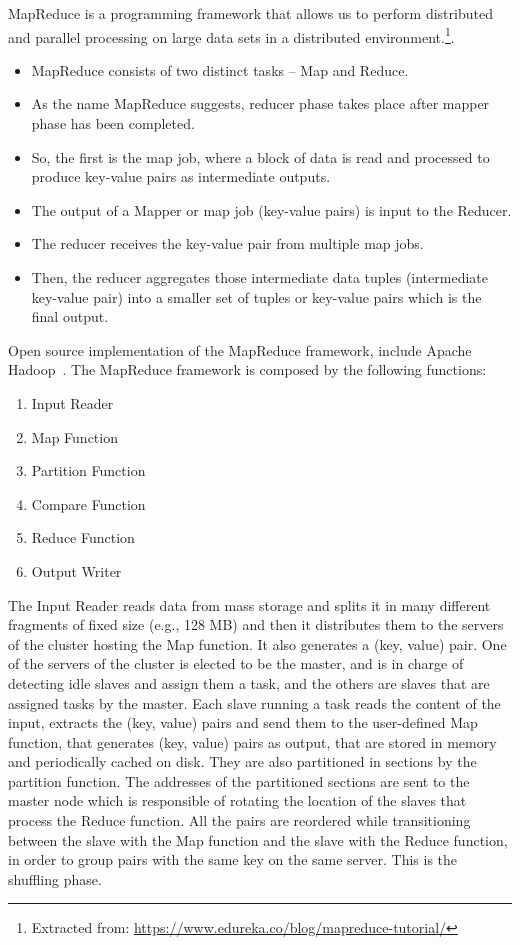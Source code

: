 MapReduce is a programming framework that allows us to perform distributed and parallel processing on large data sets in a distributed environment.\footnote{Extracted from: \url{https://www.edureka.co/blog/mapreduce-tutorial/}}.
\begin{itemize}
	\item MapReduce consists of two distinct tasks – Map and Reduce.
	\item As the name MapReduce suggests, reducer phase takes place after mapper phase has been completed.
	\item So, the first is the map job, where a block of data is read and processed to produce key-value pairs as intermediate outputs.
	\item The output of a Mapper or map job (key-value pairs) is input to the Reducer.
	\item The reducer receives the key-value pair from multiple map jobs.
	\item Then, the reducer aggregates those intermediate data tuples (intermediate key-value pair) into a smaller set of tuples or key-value pairs which is the final output.
\end{itemize}

Open source implementation of the MapReduce framework, include Apache Hadoop~\cite{misc:ApacheHadoop}. 
The MapReduce framework is composed by the following functions:
\begin{enumerate}
	\item Input Reader
	\item Map Function
	\item Partition Function
	\item Compare Function
	\item Reduce Function
	\item Output Writer
\end{enumerate}

The Input Reader reads data from mass storage and splits it in many different fragments of fixed size (e.g., 128 MB) and then it distributes them to the servers of the cluster hosting the Map function. It also generates a (key, value) pair. One of the servers of the cluster is elected to be the master, and is in charge of detecting idle slaves and assign them a task, and the others are slaves that are assigned tasks by the master. Each slave running a task reads the content of the input, extracts the (key, value) pairs and send them to the user-defined Map function, that generates (key, value) pairs as output, that are stored in memory and periodically cached on disk. They are also partitioned in sections by the partition function. The addresses of the partitioned sections are sent to the master node which is responsible of rotating the location of the slaves that process the Reduce function. All the pairs are reordered while transitioning between the slave with the Map function and the slave with the Reduce function, in order to group pairs with the same key on the same server. This is the shuffling phase. 

